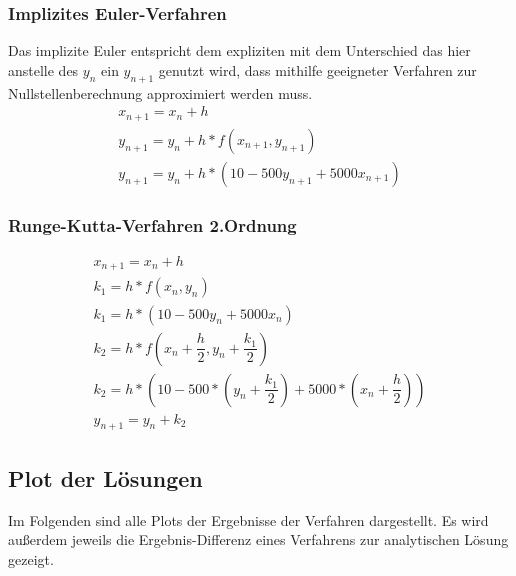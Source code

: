 \documentclass[]{scrartcl}
\begin{document}
\subsubsection{Implizites Euler-Verfahren}
Das implizite Euler entspricht dem expliziten mit dem Unterschied das hier anstelle des $y_{n}$ ein $y_{n+1}$ genutzt wird, dass mithilfe geeigneter Verfahren zur Nullstellenberechnung approximiert werden muss. 
\begin{align}
x_{n+1} = x_{n}+h \\
y_{n+1} = y_{n}+h*f(x_{n+1},y_{n+1}) \\
y_{n+1} = y_{n}+h*(10-500y_{n+1}+5000x_{n+1})
\end{align}

\subsubsection{Runge-Kutta-Verfahren 2.Ordnung}
\begin{align}
x_{n+1} = x_{n}+h \\
k_{1} = h*f(x_{n},y_{n}) \\
k_{1} = h*(10-500y_{n}+5000x_{n}) \\
k_{2} = h*f(x_{n} + \dfrac{h}{2},y_{n} + \dfrac{k_{1}}{2}) \\
k_{2} = h*(10-500*(y_{n} + \dfrac{k_{1}}{2})+5000*(x_{n} + \dfrac{h}{2})) \\
y_{n+1} = y_{n}+k_{2}
\end{align}

\subsection{Plot der Lösungen}
Im Folgenden sind alle Plots der Ergebnisse der Verfahren dargestellt. Es wird außerdem jeweils die Ergebnis-Differenz eines Verfahrens zur analytischen Lösung gezeigt.
\end{document}
